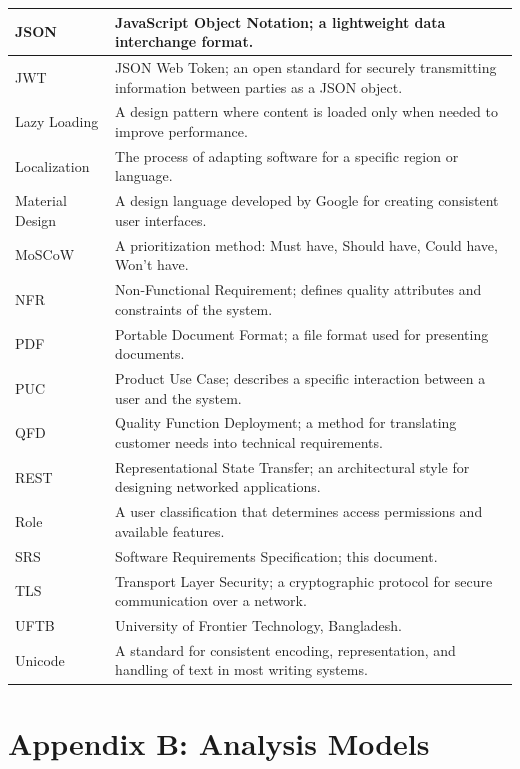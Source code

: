 \documentclass[12pt,a4paper]{article}
\begin{document}
\begin{longtable}{|p{3.5cm}|p{10.5cm}|}
\hline
JSON & JavaScript Object Notation; a lightweight data interchange format. \\
\hline
JWT & JSON Web Token; an open standard for securely transmitting information between parties as a JSON object. \\
\hline
Lazy Loading & A design pattern where content is loaded only when needed to improve performance. \\
\hline
Localization & The process of adapting software for a specific region or language. \\
\hline
Material Design & A design language developed by Google for creating consistent user interfaces. \\
\hline
MoSCoW & A prioritization method: Must have, Should have, Could have, Won't have. \\
\hline
NFR & Non-Functional Requirement; defines quality attributes and constraints of the system. \\
\hline
PDF & Portable Document Format; a file format used for presenting documents. \\
\hline
PUC & Product Use Case; describes a specific interaction between a user and the system. \\
\hline
QFD & Quality Function Deployment; a method for translating customer needs into technical requirements. \\
\hline
REST & Representational State Transfer; an architectural style for designing networked applications. \\
\hline
Role & A user classification that determines access permissions and available features. \\
\hline
SRS & Software Requirements Specification; this document. \\
\hline
TLS & Transport Layer Security; a cryptographic protocol for secure communication over a network. \\
\hline
UFTB & University of Frontier Technology, Bangladesh. \\
\hline
Unicode & A standard for consistent encoding, representation, and handling of text in most writing systems. \\
\hline
\end{longtable}

\newpage
\section*{Appendix B: Analysis Models}
\end{document}
